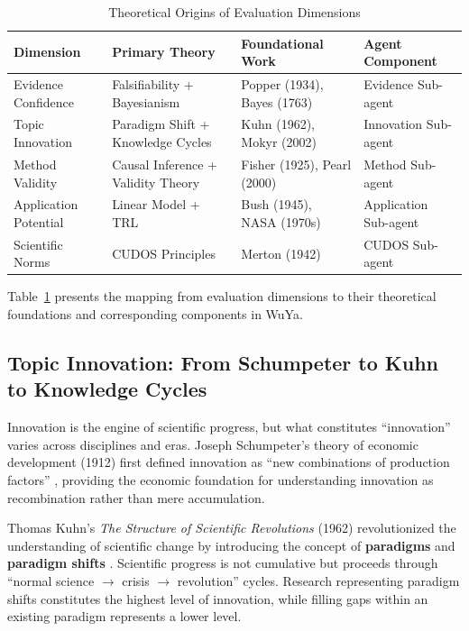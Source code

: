 \begin{table}[t]
\centering
\caption{Theoretical Origins of Evaluation Dimensions}
\label{tab:theory-mapping}
\begin{tabular}{@{}llll@{}}
\toprule
\textbf{Dimension} & \textbf{Primary Theory} & \textbf{Foundational Work} & \textbf{Agent Component} \\
\midrule
Evidence Confidence & Falsifiability + Bayesianism & Popper (1934), Bayes (1763) & Evidence Sub-agent \\
Topic Innovation & Paradigm Shift + Knowledge Cycles & Kuhn (1962), Mokyr (2002) & Innovation Sub-agent \\
Method Validity & Causal Inference + Validity Theory & Fisher (1925), Pearl (2000) & Method Sub-agent \\
Application Potential & Linear Model + TRL & Bush (1945), NASA (1970s) & Application Sub-agent \\
Scientific Norms & CUDOS Principles & Merton (1942) & CUDOS Sub-agent \\
\bottomrule
\end{tabular}
\end{table}

Table~\ref{tab:theory-mapping} presents the mapping from evaluation dimensions to their theoretical foundations and corresponding \subagent{} components in WuYa.

\subsection{Topic Innovation: From Schumpeter to Kuhn to Knowledge Cycles}

Innovation is the engine of scientific progress, but what constitutes ``innovation'' varies across disciplines and eras. Joseph Schumpeter's theory of economic development (1912) first defined innovation as ``new combinations of production factors'' \citep{schumpeter1934theory}, providing the economic foundation for understanding innovation as recombination rather than mere accumulation.

Thomas Kuhn's \textit{The Structure of Scientific Revolutions} (1962) revolutionized the understanding of scientific change by introducing the concept of \textbf{paradigms} and \textbf{paradigm shifts} \citep{kuhn1970structure}. Scientific progress is not cumulative but proceeds through ``normal science $\rightarrow$ crisis $\rightarrow$ revolution'' cycles. Research representing paradigm shifts constitutes the highest level of innovation, while filling gaps within an existing paradigm represents a lower level.


